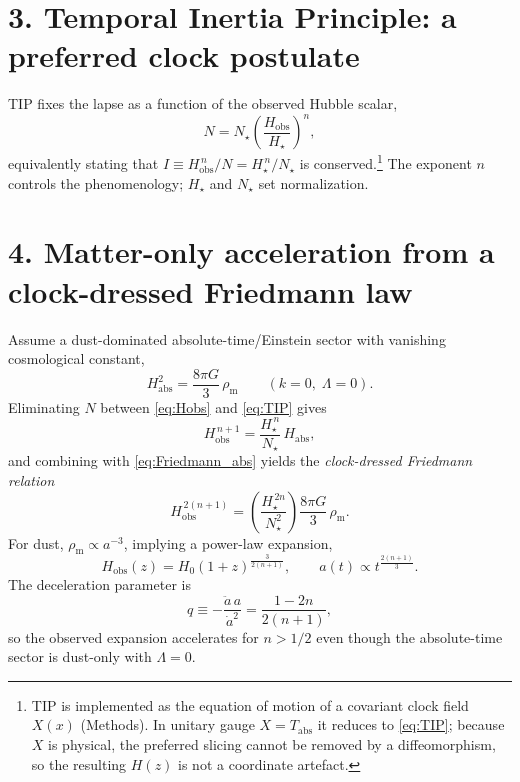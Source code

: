 \documentclass[12pt]{article}
\newcommand{\Tabs}{T_{\mathrm{abs}}}
\newcommand{\Habs}{H_{\mathrm{abs}}}
\newcommand{\Hobs}{H_{\mathrm{obs}}}
\newcommand{\rhom}{\rho_{\mathrm{m}}}
\begin{document}
\section*{3. Temporal Inertia Principle: a preferred clock postulate}
TIP fixes the lapse as a function of the observed Hubble scalar,
\begin{equation}
N = N_{\star}\left(\frac{\Hobs}{H_{\star}}\right)^{n},
\label{eq:TIP}
\end{equation}
equivalently stating that $I\equiv \Hobs^{\,n}/N = H_{\star}^{\,n}/N_{\star}$ is conserved.\footnote{TIP is implemented as the equation of motion of a covariant clock field $X(x)$ (Methods). In unitary gauge $X=\Tabs$ it reduces to \eqref{eq:TIP}; because $X$ is physical, the preferred slicing cannot be removed by a diffeomorphism, so the resulting $H(z)$ is not a coordinate artefact.}
The exponent $n$ controls the phenomenology; $H_{\star}$ and $N_{\star}$ set normalization.

\section*{4. Matter-only acceleration from a clock-dressed Friedmann law}
Assume a dust-dominated absolute-time/Einstein sector with vanishing cosmological constant,
\begin{equation}
\Habs^{2}=\frac{8\pi G}{3}\,\rhom\qquad (k=0,\;\Lambda=0).
\label{eq:Friedmann_abs}
\end{equation}
Eliminating $N$ between \eqref{eq:Hobs} and \eqref{eq:TIP} gives
\begin{equation}
\Hobs^{\,n+1}=\frac{H_{\star}^{\,n}}{N_{\star}}\,\Habs,
\end{equation}
and combining with \eqref{eq:Friedmann_abs} yields the \emph{clock-dressed Friedmann relation}
\begin{equation}
\Hobs^{\,2(n+1)}=
\left(\frac{H_{\star}^{\,2n}}{N_{\star}^{2}}\right)\frac{8\pi G}{3}\,\rhom.
\label{eq:clockdressed}
\end{equation}
For dust, $\rhom\propto a^{-3}$, implying a power-law expansion,
\begin{equation}
\Hobs(z)=H_{0}(1+z)^{\frac{3}{2(n+1)}},
\qquad
a(t)\propto t^{\frac{2(n+1)}{3}}.
\label{eq:Hz_powerlaw}
\end{equation}
The deceleration parameter is
\begin{equation}
q \equiv -\frac{\ddot a\,a}{\dot a^{2}}=\frac{1-2n}{2(n+1)},
\label{eq:q}
\end{equation}
so the observed expansion accelerates for $n>1/2$ even though the absolute-time sector is dust-only with $\Lambda=0$.
\end{document}
